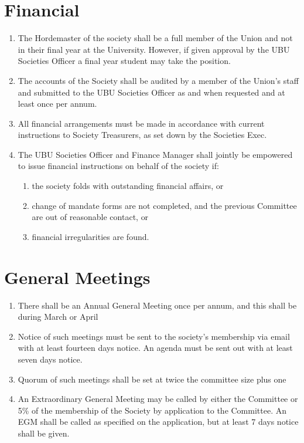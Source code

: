 \documentclass[a4paper,10pt]{article}
\begin{document}
\section{Financial}
\begin{enumerate}
  \item The Hordemaster of the society shall be a full member of the Union and not in their final year at the University. However, if given approval by the UBU Societies Officer a final year student may take the position.
  \item The accounts of the Society shall be audited by a member of the Union’s staff and submitted to the UBU Societies Officer as and when requested and at least once per annum.
  \item All financial arrangements must be made in accordance with current instructions to Society Treasurers, as set down by the Societies Exec.
  \item The UBU Societies Officer and Finance Manager shall jointly be empowered to issue financial instructions on behalf of the society if:
  \begin{enumerate}
    \item the society folds with outstanding financial affairs, or
    \item change of mandate forms are not completed, and the previous Committee are out of reasonable contact, or
    \item financial irregularities are found.
  \end{enumerate}
\end{enumerate}

\section{General Meetings}
\begin{enumerate}
  \item There shall be an Annual General Meeting once per annum, and this shall be during March or April
  \item Notice of such meetings must be sent to the society’s membership via email with at least fourteen days notice. An agenda must be sent out with at least seven days notice.
  \item Quorum of such meetings shall be set at twice the committee size plus one
  \item An Extraordinary General Meeting may be called by either the Committee or 5\% of the membership of the Society by application to the Committee. An EGM shall be called as specified on the application, but at least 7 days notice shall be given.
\end{enumerate}
\end{document}
